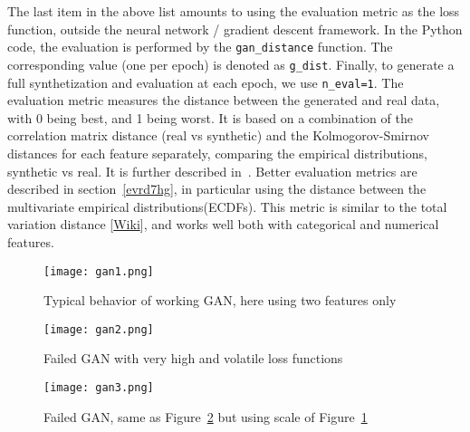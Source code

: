 \documentclass[oneside,10pt]{book}
\begin{document}
\noindent The last item in the above list amounts to using the evaluation metric as the loss function, outside the neural network / 
\textcolor{index}{gradient descent} framework. In the Python code,
 the evaluation is performed by the  \texttt{gan\_distance} function. The corresponding value (one per epoch) is denoted
 as \texttt{g\_dist}. Finally, to generate a full synthetization and evaluation at each epoch, we use \texttt{n\_eval=1}. The evaluation
 metric measures the distance between the generated and real data, with 0 being best, and 1 being worst. It is based 
 on a combination of the \textcolor{index}{correlation matrix distance} (real vs synthetic) and the 
\textcolor{index}{Kolmogorov-Smirnov distances} for each feature separately, comparing 
 the \textcolor{index}{empirical distributions}, synthetic vs real. It is further described in~\cite{vgvendors}. 
 Better evaluation metrics are described in section~\ref{evrd7hg}, in particular using the distance between the multivariate empirical distributions(ECDFs). 
This metric is similar to the \textcolor{index}{total variation distance} [\href{https://en.wikipedia.org/wiki/Total_variation_distance_of_probability_measures}{Wiki}], and works well both with categorical and numerical features.

\begin{figure}[H]
\centering
\texttt{[image: gan1.png]} %
\caption{Typical behavior of working GAN, here using two features only}
\label{fig:nog29j}
\end{figure}



\begin{figure}[H]
\centering
\texttt{[image: gan2.png]} %
\caption{Failed GAN with very high and volatile loss functions}
\label{fig:nog29jfg}
\end{figure}

\begin{figure}[H]
\centering
\texttt{[image: gan3.png]} %
\caption{Failed GAN, same as Figure~\ref{fig:nog29jfg} but using scale of Figure~\ref{fig:nog29j}}
\label{fig:nog29jq8}
\end{figure}
\end{document}
